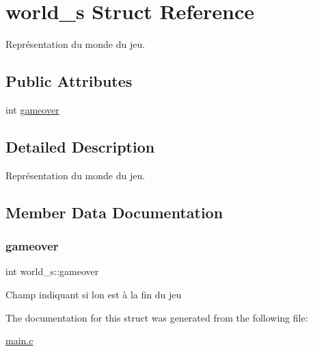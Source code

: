 \hypertarget{structworld__s}{}\section{world\+\_\+s Struct Reference}
\label{structworld__s}


Représentation du monde du jeu.  


\subsection*{Public Attributes}
\begin{DoxyCompactItemize}
\item 
int \hyperlink{structworld__s_a693aa82d082fe3467969094559b9bc0f}{gameover}
\end{DoxyCompactItemize}


\subsection{Detailed Description}
Représentation du monde du jeu. 

\subsection{Member Data Documentation}
\mbox{\label{structworld__s_a693aa82d082fe3467969094559b9bc0f}} 
\subsubsection{\texorpdfstring{gameover}{gameover}}
{\footnotesize\ttfamily int world\+\_\+s\+::gameover}

Champ indiquant si l\textquotesingle{}on est à la fin du jeu 

The documentation for this struct was generated from the following file\+:\begin{DoxyCompactItemize}
\item 
\hyperlink{main_8c}{main.\+c}\end{DoxyCompactItemize}
